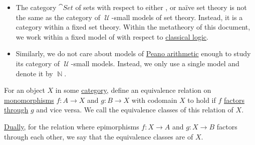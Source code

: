 \begin{example}
\begin{itemize}
    \item The category \hyperref[def:category_of_small_sets]{\( \cat{Set} \)} of sets with respect to either ,  or na\"ive set theory is not the same as the category of \( \mscrU \)-small models of set theory. Instead, it is a category within a fixed set theory. Within the metatheory of this document, we work within a fixed model of  with respect to \hyperref[def:classical_logic]{classical logic}.

    \item Similarly, we do not care about models of \hyperref[def:peano_arithmetic]{Peano arithmetic} enough to study its category of \( \mscrU \)-small models. Instead, we only use a single model and denote it by \( \BbbN \).
  \end{itemize}
\end{example}

\begin{definition}\label{def:subobject_and_quotient}
  For an object \( X \) in some \hyperref[def:category]{category}, define an equivalence relation on \hyperref[def:morphism_invertibility/left_cancellative]{monomorphisms} \( f: A \to X \) and \( g: B \to X \) with codomain \( X \) to hold if \( f \) \hyperref[def:factors_through]{factors through} \( g \) and vice versa. We call the equivalence classes of this relation  of \( X \).

  \hyperref[thm:categorical_principle_of_duality]{Dually}, for the relation where epimorphisms \( f: X \to A \) and \( g: X \to B \) factors through each other, we say that the equivalence classes are  of \( X \).
\end{definition}

